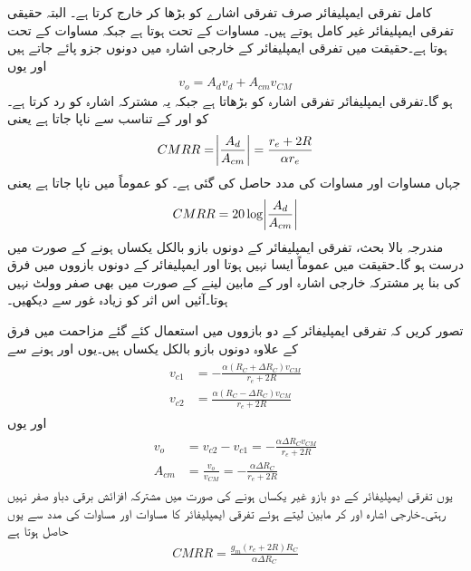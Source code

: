 کامل تفرقی ایمپلیفائر صرف تفرقی اشارے کو بڑھا کر خارج کرتا ہے۔ البتہ حقیقی تفرقی ایمپلیفائر غیر کامل ہوتے ہیں۔ مساوات   کے تحت  ہوتا ہے جبکہ مساوات   کے تحت   ہوتا ہے۔حقیقت میں تفرقی ایمپلیفائر کے خارجی اشارہ میں دونوں جزو پائے جاتے ہیں اور یوں
\begin{align}
v_o = A_d v_d + A_{cm} v_{CM}
\end{align}
ہو گا۔تفرقی ایمپلیفائر تفرقی اشارہ کو بڑھاتا ہے جبکہ یہ مشترکہ اشارہ کو رد کرتا ہے۔   کو   اور    کے تناسب سے ناپا جاتا ہے یعنی
\begin{align}
CMRR=\abs{ \frac{A_d}{A_{cm}} } =\frac{r_e + 2 R}{\alpha r_e}
\end{align}
جہاں مساوات   اور مساوات   کی مدد حاصل کی گئی ہے۔  کو عموماً   میں ناپا جاتا ہے یعنی
\begin{align}
CMRR= 20 \log \abs{\frac{A_d}{A_{cm}}}
\end{align}
مندرجہ بالا بحث، تفرقی ایمپلیفائر کے دونوں بازو بالکل یکساں ہونے کے صورت میں درست ہو گا۔حقیقت میں عموماً ایسا نہیں ہوتا اور ایمپلیفائر کے دونوں بازووں میں فرق کی بنا پر مشترکہ خارجی اشارہ   اور  کے مابین لینے کے صورت میں بھی صفر وولٹ نہیں ہوتا۔آئیں اس اثر کو زیادہ غور سے دیکھیں۔

تصور کریں کہ تفرقی ایمپلیفائر کے دو بازووں میں استعمال کئے گئے مزاحمت  میں فرق کے علاوہ دونوں بازو بالکل یکساں ہیں۔یوں  اور   ہونے سے
\begin{gather}
\begin{aligned}
v_{c1} &=-\frac{\alpha \left(R_C+\Delta R_C \right ) v_{CM}}{r_e+2 R}\\
v_{c2} &=\frac{\alpha \left(R_C - \Delta R_C \right ) v_{CM}}{r_e+2 R}
\end{aligned}
\end{gather}
اور یوں
\begin{gather}
\begin{aligned}
v_o &=v_{c2}-v_{c1}=-\frac{\alpha \Delta R_C v_{CM}}{r_e + 2R}\\
A_{cm} &=\frac{v_o}{v_{CM}} =-\frac{\alpha \Delta R_C}{r_e + 2R} \label{مساوات_تفرقی_مشترک_افزائش}
\end{aligned}
\end{gather}
یوں تفرقی ایمپلیفائر کے دو بازو غیر یکساں ہونے کی صورت میں مشترکہ افزائش برقی دباو صفر نہیں رہتی۔خارجی اشارہ  اور  کر مابین لیتے ہوئے تفرقی ایمپلیفائر کا   مساوات   اور مساوات   کی مدد سے یوں حاصل ہوتا ہے
\begin{align}
CMRR=\frac{g_m \left(r_e + 2 R \right ) R_C}{\alpha \Delta R_C}
\end{align}

